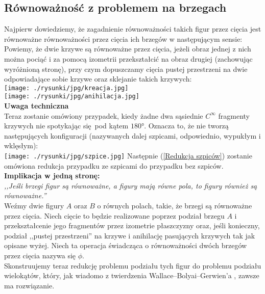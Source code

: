 \documentclass[a4paper, 12pt, twosided]{article}
\newcommand{\rysunek}[1]{\hfill \break\\[16pt] \Huge \textbf{\textcolor{violet}{Brakujący rysunek 
\normalsize
#1}} \hfill
\break \\[16pt] \normalsize}
\begin{document}
\subsection{Równoważność z problemem na brzegach}
Najpierw dowiedziemy, że zagadnienie równoważności takich figur przez cięcia jest równoważne 
równoważności
przez cięcia ich brzegów w następującym sensie: \\
Powiemy, że dwie krzywe są równoważne przez cięcia, jeżeli obraz jednej z nich można pociąć i za 
pomocą
izometrii przekształcić na obraz drugiej (zachowując wyróżnioną stronę), 
przy czym dopuszczamy cięcia pustej
przestrzeni na dwie
odpowiadające sobie krzywe oraz sklejanie takich krzywych: \\
\texttt{[image: ./rysunki/jpg/kreacja.jpg]} \\
\texttt{[image: ./rysunki/jpg/anihilacja.jpg]} \\
\textbf{Uwaga techniczna}\\
Teraz zostanie omówiony przypadek, kiedy żadne dwa sąsiednie $C^\infty$ fragmenty krzywych nie 
spotykając się pod kątem $180\si{\degree}$. Oznacza to, że nie tworzą następujących konfiguracji 
(nazywanych dalej szpicami, odpowiednio, wypukłym i wklęsłym): \\
\texttt{[image: ./rysunki/jpg/szpice.jpg]}
Następnie (\ref{Redukcja szpiców}) zostanie omówiona redukcja przypadku ze szpicami do przypadku 
 bez 
szpiców. \\
\textbf{Implikacja w jedną stronę:} \\
\textit{,,Jeśli brzegi figur są równoważne, a figury mają równe pola, to figury również są
 równoważne.''} \\
Weźmy dwie figury $A$ oraz $B$ o równych polach, takie, że brzegi są równoważne przez cięcia. Niech 
cięcie
to będzie realizowane poprzez podział brzegu $A$ i przekształcenie jego fragmentów przez izometrie
 płaszczyzny oraz,
jeśli konieczny, podział ,,pustej przestrzeni'' na krzywe i anihilację pasujących krzywych tak jak 
opisane
wyżej. Niech ta operacja świadcząca o równoważności dwóch brzegów przez cięcia nazywa się $\phi$. \\
Skonstruujemy teraz redukcję problemu podziału tych figur do problemu podziału wielokątów, który, 
jak wiadomo
 z twierdzenia Wallace–Bolyai–Gerwien'a \cite{WBG}, zawsze ma rozwiązanie. \\
\end{document}
